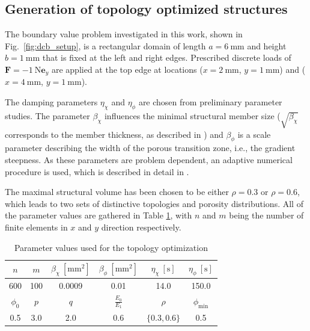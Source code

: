 \documentclass[
	pdflatex,
	sn-mathphys-num
]{sn-jnl}
\theoremstyle{thmstyleone}%
\theoremstyle{thmstyletwo}%
\theoremstyle{thmstylethree}%
\begin{document}


\subsection{Generation of topology optimized structures}
\label{sec:optimized_structures}

The boundary value problem investigated in this work, shown in
Fig.~\ref{fig:dcb_setup}, is a rectangular domain of
length $a=6~\mathrm{mm}$ and height $b=1~\mathrm{mm}$ that is fixed at the left and right
edges.
Prescribed discrete loads of $\boldsymbol{F}=-1~\mathrm{N}\boldsymbol{e}_y$ are
applied at the top edge at locations ($x=2~\mathrm{mm}$, $y=1~\mathrm{mm}$) and
($x=4~\mathrm{mm}$, $y=1~\mathrm{mm}$).

The damping parameters $\eta_\chi$ and $\eta_\phi$ are chosen from preliminary parameter studies. The parameter $\beta_\chi$ influences the minimal structural member size ($\sqrt{\beta_\chi}$ corresponds to the member thickness, as described in \cite{jantos_accurate_2019}) and $\beta_\phi$ is a scale parameter describing the width of the porous transition zone, i.e., the gradient steepness. As these parameters are problem dependent, an adaptive numerical procedure is used, which is described in detail in \cite{pravda_macroscopic_2026}.

The maximal structural volume has been chosen to be either $\rho=0.3$ or $\rho=0.6$, which leads to two sets of distinctive topologies and porosity distributions. All of the parameter values are gathered in Table \ref{tab:topopt_param}, with $n$ and $m$ being the number of finite elements in $x$ and $y$ direction respectively.

\begin{table}[!htbp]
    \centering

    \begin{tabular}{cccccc}
        $n$ & $m$ & $\beta_\chi~[\mathrm{mm^2}]$
        & $\beta_\phi~[\mathrm{mm^2}]$ & $\eta_\chi~[\mathrm{s}]$
        & $\eta_\phi~[\mathrm{s}]$ \\
        \hline
        600 & 100 & 0.0009 & 0.01 & 14.0 & 150.0 \\
        \addlinespace
        $\phi_0$ & $p$ & $q$ & $\tfrac{E_0}{E_1}$ & $\rho$
        & $\phi_\mathrm{min}$ \\
        \hline
        0.5 & 3.0 & 2.0 & 0.6 & $\{0.3, 0.6\}$ & 0.5
    \end{tabular}
    \caption{{Parameter values used for the topology optimization}}

     \label{tab:topopt_param}
\end{table}
\end{document}
